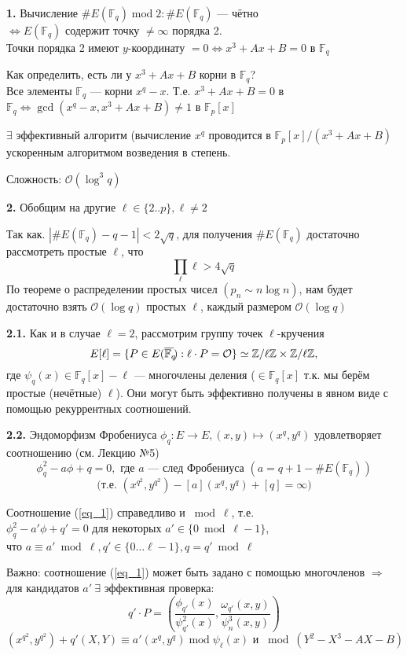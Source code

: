 \documentclass[12pt]{article}
\newcommand{\Z}{{{\mathbb Z}}}
\newcommand{\F}{{{\mathbb F}}}
\newcommand{\bigO}{\mathcal{O}}
\newcommand{\overbar}[1]{\overline{\mkern-0.0mu#1\mkern-4.0mu}}
\theoremstyle{definition}
\theoremstyle{definition}
\theoremstyle{definition}
\begin{document}
\textbf{1.} Вычисление $\#E(\F_q) \operatorname{mod} 2: \#E(\F_q)$ — чётно \\
$\Leftrightarrow E(\F_q)$ содержит точку $\neq \infty$ порядка 2. \\
Точки порядка 2 имеют $y$-координату $= 0 \Leftrightarrow x^3 + Ax+B = 0$ в $\F_q$

Как определить, есть ли у $x^3 + Ax+ B$ корни в $\F_q$?\\
Все элементы $\F_q$ — корни $x^q-x$. Т.е. $x^3+Ax+B=0$ в $\F_q \Leftrightarrow \gcd(x^q - x, x^3+Ax+B) \neq 1$ в $\F_p[x]$

$\exists$ эффективный алгоритм (вычисление $x^q$ проводится в $\F_p[x] / (x^3 + Ax+ B)$ ускоренным алгоритмом возведения в степень.

Сложность: $\bigO(\log^3 q)$


\textbf{2.} Обобщим на другие $\ell \in \{2..p\}, \ell \neq 2$

Так как. $|\#E(\F_q) - q - 1| < 2\sqrt{q}$, для получения $\#E(\F_q)$ достаточно рассмотреть простые $\ell$, что 
\[
    \prod_\ell \ell > 4\sqrt{q}
\]
По теореме о распределении простых чисел $(p_n \sim n \log n)$, нам будет достаточно взять $\bigO(\log q)$ простых $\ell$, каждый размером $\bigO(\log q)$

\textbf{2.1.} Как и в случае $\ell = 2$, рассмотрим группу точек $\ell$-кручения 
\[
    E[\ell] = \{ P \in E(\overbar{\F_q}): \ell\cdot P = \bigO \} \simeq \Z/\ell\Z \times \Z/\ell\Z,
\]
где $\psi_q(x) \in \F_q[x] - \ell$ — многочлены деления ($\in \F_q[x]$ т.к. мы берём простые (нечётные) $\ell$). Они могут быть эффективно получены в явном виде с помощью рекуррентных соотношений.

\textbf{2.2.} Эндоморфизм Фробениуса $\phi_q: E \rightarrow E, (x,y)\mapsto (x^q, y^q)$ удовлетворяет соотношению (см. Лекцию №5)
\begin{equation}
\label{eq_1}
    \phi_q^2 - a\phi + q = 0, \text{ где } a \text{ — след Фробениуса } (a = q+1-\#E(\F_q))
\end{equation}
\[
    \text{(т.е. } (x^{q^2}, y^{q^2}) - [a](x^q, y^q) + [q] = \infty)
\]

Соотношение (\ref{eq_1}) справедливо и $\bmod \ell$, т.е.\\
$\phi_q^2 - a'\phi + q' = 0$ для некоторых $a' \in \{0 \bmod  \ell-1\}$,\\
что $a \equiv a' \bmod \ell, q' \in \{0 \ldots \ell-1\}, q=q' \bmod \ell$

Важно: соотношение (\ref{eq_1}) может быть задано с помощью многочленов $\Rightarrow$ для кандидатов $a'\ \exists$ эффективная проверка:
\[
    q'\cdot P = \left(\frac{\phi_{q'}(x)}{\psi^2_{q'}(x)}, \frac{\omega_{q'}(x,y)}{\psi^3_n(x,y)} \right)
\]
\[
    (x^{q^2}, y^{q^2}) + q'(X,Y) \equiv a'(x^q, y^q) \operatorname{mod} \psi_\ell(x) \text{ и } \bmod  (Y^2-X^3-AX-B)
\]
\end{document}

